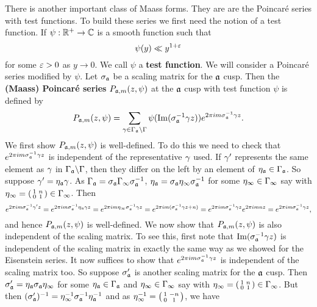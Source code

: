 \documentclass[12pt,oneside]{book}
\begin{document}
    There is another important class of Maass forms. They are are the Poincar\'e series with test functions. To build these series we first need the notion of a test function. If $\psi:\mathbb{R}^{+} \to \mathbb{C}$ is a smooth function such that
    \[
      \psi(y) \ll y^{1+\varepsilon}
    \]
    for some $\varepsilon > 0$ as $y \to 0$. We call $\psi$ a \textbf{test function}. We will consider a Poincar\'e series modified by $\psi$. Let $\sigma_{\mathfrak{a}}$ be a scaling matrix for the $\mathfrak{a}$ cusp. Then the \textbf{(Maass) Poincar\'e series} $P_{\mathfrak{a},m}(z,\psi)$ at the $\mathfrak{a}$ cusp with test function $\psi$ is defined by
    \[
      P_{\mathfrak{a},m}(z,\psi) = \sum_{\gamma \in \Gamma_{\mathfrak{a}}\backslash\Gamma}\psi(\mathrm{Im}(\sigma_{\mathfrak{a}}^{-1}\gamma z))e^{2\pi im\sigma_{\mathfrak{a}}^{-1}\gamma z}.
    \]
    We first show $P_{\mathfrak{a},m}(z,\psi)$ is well-defined. To do this we need to check that $e^{2\pi im\sigma_{\mathfrak{a}}^{-1}\gamma z}$ is independent of the representative $\gamma$ used. If $\gamma'$ represents the same element as $\gamma$ in $\Gamma_{\mathfrak{a}}\backslash\Gamma$, then they differ on the left by an element of $\eta_{\mathfrak{a}} \in \Gamma_{\mathfrak{a}}$. So suppose $\gamma' = \eta_{\mathfrak{a}}\gamma$. As $\Gamma_{\mathfrak{a}} = \sigma_{\mathfrak{a}}\Gamma_{\infty}\sigma_{\mathfrak{a}}^{-1}$, $\eta_{\mathfrak{a}} = \sigma_{\mathfrak{a}}\eta_{\infty}\sigma_{\mathfrak{a}}^{-1}$ for some $\eta_{\infty} \in \Gamma_{\infty}$ say with $\eta_{\infty} = \begin{psmallmatrix} 1 & n \\ 0 & 1 \end{psmallmatrix} \in \Gamma_{\infty}$. Then
    \[
      e^{2\pi im\sigma_{\mathfrak{a}}^{-1}\gamma' z} = e^{2\pi im\sigma_{\mathfrak{a}}^{-1}\eta_{\mathfrak{a}}\gamma z} = e^{2\pi im\eta_{\infty}\sigma_{\mathfrak{a}}^{-1}\gamma z} = e^{2\pi im(\sigma_{\mathfrak{a}}^{-1}\gamma z+n)} = e^{2\pi im\sigma_{\mathfrak{a}}^{-1}\gamma z}e^{2\pi imnz} = e^{2\pi im\sigma_{\mathfrak{a}}^{-1}\gamma z},
    \]
    and hence $P_{\mathfrak{a},m}(z,\psi)$ is well-defined. We now show that $P_{\mathfrak{a},m}(z,\psi)$ is also independent of the scaling matrix. To see this, first note that $\mathrm{Im}(\sigma_{\mathfrak{a}}^{-1}\gamma z)$ is independent of the scaling matrix in exactly the same way as we showed for the Eisenstein series. It now suffices to show that $e^{2\pi im\sigma_{\mathfrak{a}}^{-1}\gamma z}$ is independent of the scaling matrix too. So suppose $\sigma_{\mathfrak{a}}'$ is another scaling matrix for the $\mathfrak{a}$ cusp. Then $\sigma_{\mathfrak{a}}' = \eta_{\mathfrak{a}}\sigma_{\mathfrak{a}}\eta_{\infty}$ for some $\eta_{\mathfrak{a}} \in \Gamma_{\mathfrak{a}}$ and $\eta_{\infty} \in \Gamma_{\infty}$ say with $\eta_{\infty} = \begin{psmallmatrix} 1 & n \\ 0 & 1 \end{psmallmatrix} \in \Gamma_{\infty}$. But then $(\sigma_{\mathfrak{a}}')^{-1} = \eta_{\infty}^{-1}\sigma_{\mathfrak{a}}^{-1}\eta_{\mathfrak{a}}^{-1}$ and as $\eta_{\infty}^{-1} = \begin{psmallmatrix} 1 & -n \\ 0 & 1 \end{psmallmatrix}$, we have
\end{document}

